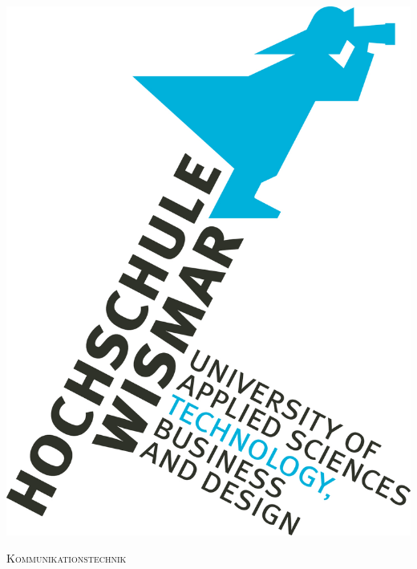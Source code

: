 \documentclass[12pt]{article}
\begin{document}
\begin{titlepage}

\newcommand{\HRule}{\rule{\linewidth}{0.5mm}} %

\center %


\noindent\begin{minipage}[t][0.3819660112501052\paperheight][t]{\textwidth}
\centering
\vspace{0.09016994374947421\paperheight}
\includegraphics[scale=0.382]{logo.jpg}
\end{minipage}

\textsc{\Large Kommunikationstechnik}\\[0.5cm] %


\end{titlepage}
\end{document}
